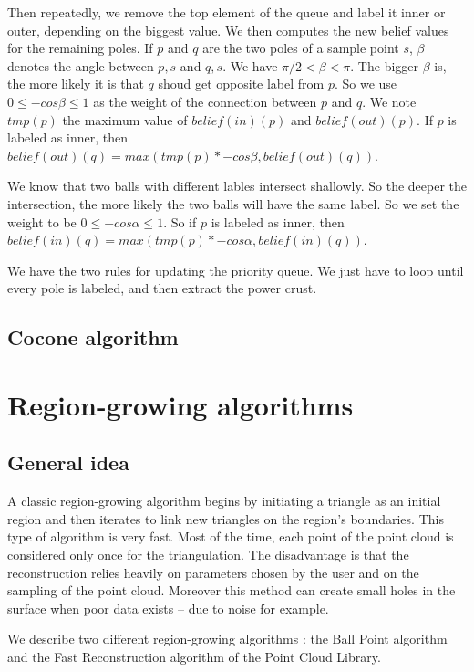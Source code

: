 \documentclass[a4paper]{article}
\begin{document}
Then repeatedly, we remove the top element of the queue and label it inner or outer, depending on the biggest value. We then computes the new belief values for the remaining poles. If $p$ and $q$ are the two poles of a sample point $s$, $\beta$ denotes the angle between $p,s$ and $q,s$. We have $\pi/2 < \beta < \pi$. The bigger $\beta$ is, the more likely it is that $q$ shoud get opposite label from $p$. So we use $0 \le -cos\beta \le 1$ as the weight of the connection between $p$ and $q$. We note $tmp(p)$ the maximum value of $belief(in)(p)$ and $belief(out)(p)$. If $p$ is labeled as inner, then $belief(out)(q) = max(tmp(p)*-cos\beta, belief(out)(q))$.

We know that two balls with different lables intersect shallowly. So the deeper the intersection, the more likely the two balls will have the same label. So we set the weight to be $0 \le -cos\alpha \le 1$. So if $p$ is labeled as inner, then $belief(in)(q) = max(tmp(p)*-cos\alpha, belief(in)(q))$.

We have the two rules for updating the priority queue. We just have to loop until every pole is labeled, and then extract the power crust.

\subsection{Cocone algorithm}

\newpage

\section{Region-growing algorithms}
\subsection{General idea}
A classic region-growing algorithm begins by initiating a triangle as an initial region and then iterates to link new triangles on the region's boundaries. This type of algorithm is very fast. Most of the time, each point of the point cloud is considered only once for the triangulation. The disadvantage is that the reconstruction relies heavily on parameters chosen by the user and on the sampling of the point cloud. Moreover this method can create small holes in the surface when poor data  exists -- due to noise for example. 

We describe two different region-growing algorithms : the Ball Point algorithm and the Fast Reconstruction algorithm of the Point Cloud Library.
\end{document}
